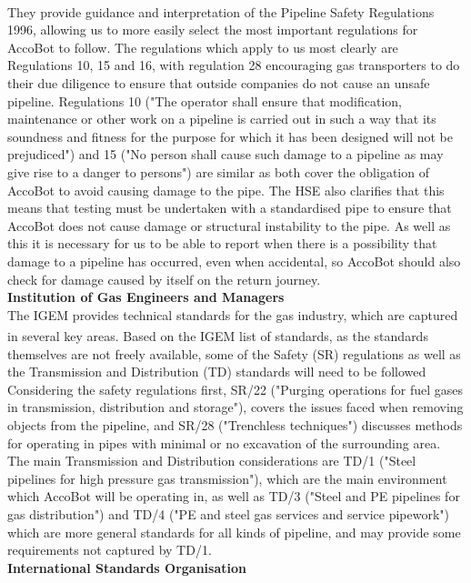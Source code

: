 \documentclass[11pt]{article}		%
\newcommand{\supercite}[1]{\textsuperscript{\cite{#1}}}		%
\begin{document}
			They provide guidance and interpretation\supercite{hse1996guide} of the Pipeline Safety Regulations 1996, allowing us to more easily select the most important regulations for AccoBot to follow.
			The regulations which apply to us most clearly are Regulations 10, 15 and 16, with regulation 28 encouraging gas transporters to do their due diligence to ensure that outside companies do not cause an unsafe pipeline.
			Regulations 10 ("The operator shall ensure that modification, maintenance or other work on a pipeline is carried out in such a way that its soundness and fitness for the purpose for which it has been designed will not be prejudiced") and 15 ("No person shall cause such damage to a pipeline as may give rise to a danger to persons") are similar as both cover the obligation of AccoBot to avoid causing damage to the pipe.
			The HSE also clarifies that this means that testing must be undertaken with a standardised pipe to ensure that AccoBot does not cause damage or structural instability to the pipe.
			As well as this it is necessary for us to be able to report when there is a possibility that damage to a pipeline has occurred, even when accidental, so AccoBot should also check for damage caused by itself on the return journey.
			\\
			\textbf{Institution of Gas Engineers and Managers}
			\\
			The IGEM provides technical standards for the gas industry, which are captured in several key areas.
			Based on the IGEM list of standards\supercite{institution2021igem}, as the standards themselves are not freely available, some of the Safety (SR) regulations  as well as the Transmission and Distribution (TD) standards will need to be followed
			Considering the safety regulations first, SR/22 ("Purging operations for fuel gases in transmission, distribution and storage"), covers the issues faced when removing objects from the pipeline, and SR/28 ("Trenchless techniques") discusses methods for operating in pipes with minimal or no excavation of the surrounding area.
			The main Transmission and Distribution considerations are TD/1 ("Steel pipelines for high pressure gas transmission"), which are the main environment which AccoBot will be operating in, as well as TD/3 ("Steel and PE pipelines for gas distribution") and TD/4 ("PE and steel gas services and service pipework") which are more general standards for all kinds of pipeline, and may provide some requirements not captured by TD/1.
			\\
			\textbf{International Standards Organisation}
\end{document}
